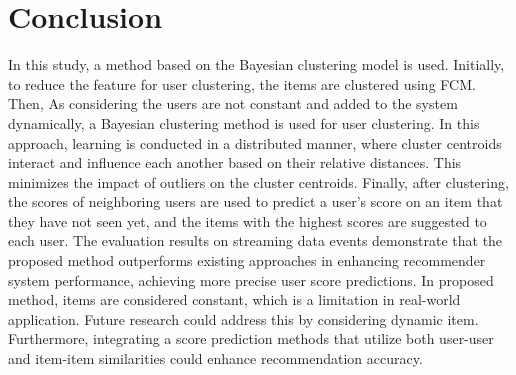 \documentclass{article}
\begin{document}
\section{Conclusion}
In this study, a method based on the Bayesian clustering model is used. Initially, to reduce the feature for user clustering, the items are clustered using FCM. Then, As considering the users are not constant and added to the system dynamically, a Bayesian clustering method is used for user clustering. In this approach, learning is conducted in a distributed manner, where cluster centroids interact and influence each another based on their relative distances. This minimizes the impact of outliers on the cluster centroids. Finally, after clustering, the scores of neighboring users are used to predict a user's score on an item that they have not seen yet, and the items with the highest scores are suggested to each user. The evaluation results on streaming data events demonstrate that the proposed method outperforms existing approaches in enhancing recommender system performance, achieving more precise user score predictions. In proposed method, items are considered constant, which is a limitation in real-world application. Future research could address this by considering dynamic item. Furthermore, integrating a score prediction methods that utilize both user-user and item-item similarities could enhance recommendation accuracy.

% 
\printbibliography
\end{document}
